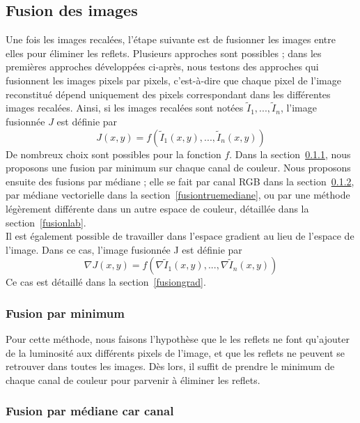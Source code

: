\documentclass[12pt,a4paper]{article}
\begin{document}
\subsection{Fusion des images}
Une fois les images recalées, l'étape suivante est de fusionner les images entre elles pour éliminer les reflets. Plusieurs approches sont possibles ; dans les premières approches développées ci-après, nous testons des approches qui fusionnent les images pixels par pixels, c'est-à-dire que chaque pixel de l'image reconstitué dépend uniquement des pixels correspondant dans les différentes images recalées. Ainsi, si les images recalées sont notées \( \tilde I_1, ..., \tilde I_n \), l'image fusionnée \(J\) est définie par
\[
J(x,y)=f\left(\tilde I_1(x,y), ..., \tilde I_n(x,y)\right)
\]
De nombreux choix sont possibles pour la fonction $f$. Dans la section~\ref{fusionmin}, nous proposons une fusion par minimum sur chaque canal de couleur. Nous proposons ensuite des fusions par médiane ; elle se fait par canal RGB dans la section~\ref{fusionmediane}, par médiane vectorielle dans la section~\ref{fusiontruemediane}, ou par une méthode légèrement différente dans un autre espace de couleur, détaillée dans la section~\ref{fusionlab}.\\
Il est également possible de travailler dans l'espace gradient au lieu de l'espace de l'image. Dans ce cas, l'image fusionnée J est définie par
\[
\nabla J(x,y)=f\left(\nabla \tilde I_1(x,y), ..., \nabla \tilde I_n(x,y)\right)
\]
Ce cas est détaillé dans la section~\ref{fusiongrad}.
\subsubsection{Fusion par minimum}
\label{fusionmin}
Pour cette méthode, nous faisons l'hypothèse que le les reflets ne font qu'ajouter de la luminosité aux différents pixels de l'image, et que les reflets ne peuvent se retrouver dans toutes les images. Dès lors, il suffit de prendre le minimum de chaque canal de couleur pour parvenir à éliminer les reflets.
\subsubsection{Fusion par médiane car canal}
\label{fusionmediane}
\end{document}
